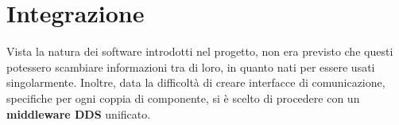 \section{Integrazione}
Vista la natura dei software introdotti nel progetto, non era previsto che questi potessero scambiare informazioni tra di loro, in quanto nati per essere usati singolarmente. Inoltre, data la difficoltà di creare interfacce di comunicazione, specifiche per ogni coppia di componente, si è scelto di procedere con un \textbf{middleware DDS} unificato. %